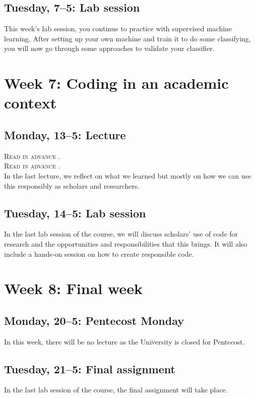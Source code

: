 \subsection*{Tuesday, 7--5: Lab session}
This week's lab session, you continue to practice with supervised machine learning. After setting up your own machine and train it to do some classifying, you will now go through some approaches to validate your classifier.

\section*{Week 7: Coding in an academic context}

\subsection*{Monday, 13--5: Lecture}
\textsc{ Read in advance \cite{hube_understanding_2019}.} \\
\textsc{ Read in advance \cite{bender_dangers_2021}.} \\

In the last lecture, we reflect on what we learned but mostly on how we can use this responsibly as scholars and researchers. 

\subsection*{Tuesday, 14--5: Lab session}
In the last lab session of the course, we will discuss scholars' use of code for research and the opportunities and responsibilities that this brings. It will also include a hands-on session on how to create responsible code.

\section*{Week 8: Final week}

\subsection*{Monday, 20--5: Pentecost Monday}
In this week, there will be no lecture as the University is closed for Pentecost.

\subsection*{Tuesday, 21--5: Final assignment}
In the last lab session of the course, the final assignment will take place. 









